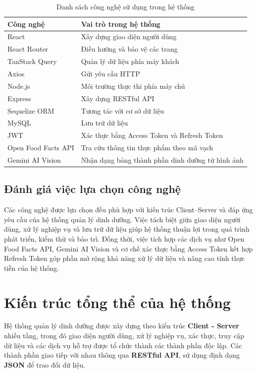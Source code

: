 \documentclass[12pt, a4paper]{report}
\begin{document}
\begin{table}[htbp]
\centering
\caption{Danh sách công nghệ sử dụng trong hệ thống}
\begin{tabular}{|p{5cm}|p{10cm}|}
\hline
\textbf{Công nghệ} & \textbf{Vai trò trong hệ thống} \\
\hline
React & Xây dựng giao diện người dùng \\
\hline
React Router & Điều hướng và bảo vệ các trang \\
\hline
TanStack Query & Quản lý dữ liệu phía máy khách \\
\hline
Axios & Gửi yêu cầu HTTP \\
\hline
Node.js & Môi trường thực thi phía máy chủ \\
\hline
Express & Xây dựng RESTful API \\
\hline
Sequelize ORM & Tương tác với cơ sở dữ liệu \\
\hline
MySQL & Lưu trữ dữ liệu \\
\hline
JWT & Xác thực bằng Access Token và Refresh Token \\
\hline
Open Food Facts API & Tra cứu thông tin thực phẩm theo mã vạch \\
\hline
Gemini AI Vision & Nhận dạng bảng thành phần dinh dưỡng từ hình ảnh \\
\hline
\end{tabular}
\end{table}
\subsection{Đánh giá việc lựa chọn công nghệ}Các công nghệ được lựa chọn đều phù hợp với kiến trúc Client–Server và đáp ứng yêu cầu của hệ thống quản lý dinh dưỡng. Việc tách biệt giữa giao diện người dùng, xử lý nghiệp vụ và lưu trữ dữ liệu giúp hệ thống thuận lợi trong quá trình phát triển, kiểm thử và bảo trì. Đồng thời, việc tích hợp các dịch vụ như Open Food Facts API, Gemini AI Vision và cơ chế xác thực bằng Access Token kết hợp Refresh Token góp phần mở rộng khả năng xử lý dữ liệu và nâng cao tính thực tiễn của hệ thống.

\section{Kiến trúc tổng thể của hệ thống}Hệ thống quản lý dinh dưỡng được xây dựng theo kiến trúc \textbf{Client - Server} nhiều tầng, trong đó giao diện người dùng, xử lý nghiệp vụ, xác thực, truy cập dữ liệu và các dịch vụ hỗ trợ được tổ chức thành các thành phần độc lập. Các thành phần giao tiếp với nhau thông qua \textbf{RESTful API}, sử dụng định dạng \textbf{JSON} để trao đổi dữ liệu.
\end{document}
